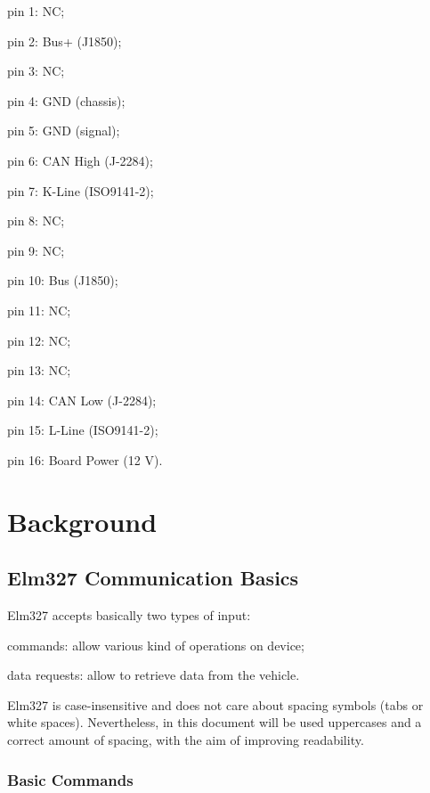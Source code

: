 \documentclass[twoside]{article}
\begin{document}
\begin{multicols}{2}
\begin{compactitem}
\item pin 1: NC;
\item pin 2: Bus+ (J1850);
\item pin 3: NC;
\item pin 4: GND (chassis);
\item pin 5: GND (signal);
\item pin 6: CAN High (J-2284);
\item pin 7: K-Line (ISO9141-2);
\item pin 8: NC;
\item pin 9: NC;
\item pin 10: Bus (J1850);
\item pin 11: NC;
\item pin 12: NC;
\item pin 13: NC;
\item pin 14: CAN Low (J-2284);
\item pin 15: L-Line (ISO9141-2);
\item pin 16: Board Power (12 V).
\end{compactitem}



\section{Background}

\subsection{Elm327 Communication Basics}

Elm327 accepts basically two types of input:
\begin{compactitem}
  \item commands: allow various kind of operations on device;
  \item data requests: allow to retrieve data from the vehicle.
\end{compactitem}

Elm327 is case-insensitive and does not care about spacing symbols (tabs or white spaces).
Nevertheless, in this document will be used uppercases and a correct amount of spacing, with the aim of improving readability.

\subsubsection{Basic Commands}


\end{multicols}
\end{document}
